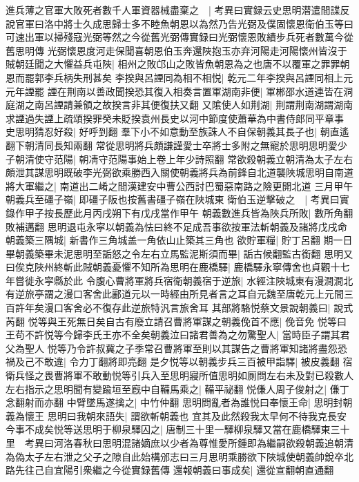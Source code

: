 進兵薄之官軍大敗死者數千人軍資器械盡棄之　|{
	考異曰實録云史思明潜遣間諜反說官軍曰洛中將士久成思歸士多不睦魚朝恩以為然乃告光弼及僕固懷恩衛伯玉等曰可速出軍以掃殘寇光弼等然之今從舊光弼傳實録曰光弼懷恩敗績步兵死者數萬今從舊思明傳}
光弼懷恩度河走保聞喜朝恩伯玉奔還陜抱玉亦弃河陽走河陽懷州皆沒于賊朝廷聞之大懼益兵屯陜|{
	相州之敗邙山之敗皆魚朝恩為之也唐不以覆軍之罪罪朝恩而罷郭李兵柄失刑甚矣}
李揆與呂諲同為相不相悦|{
	乾元二年李揆與呂諲同相上元元年諲罷}
諲在荆南以善政聞揆恐其復入相奏言置軍湖南非便|{
	軍郴邵水道連皆在洞庭湖之南呂諲請兼領之故揆言非其便復扶又翻}
又隂使人如荆湖|{
	荆謂荆南湖謂湖南}
求諲過失諲上疏頌揆罪癸未貶揆袁州長史以河中節度使蕭華為中書侍郎同平章事　史思明猜忍好殺|{
	好呼到翻}
羣下小不如意動至族誅人不自保朝義其長子也|{
	朝直遙翻下朝清同長知兩翻}
常從思明將兵頗謙謹愛士卒將士多附之無寵於思明思明愛少子朝清使守范陽|{
	朝凊守范陽事始上卷上年少詩照翻}
常欲殺朝義立朝清為太子左右頗泄其謀思明既破李光弼欲乘勝西入關使朝義將兵為前鋒自北道襲陜城思明自南道將大軍繼之|{
	南道出二崤之間漢建安中曹公西討巴蜀惡南路之險更開北道}
三月甲午朝義兵至礓子嶺|{
	即礓子阪也按舊書礓子嶺在陜城東}
衛伯玉逆擊破之　|{
	考異曰實錄作甲子按長歷此月丙戌朔下有戊戌當作甲午}
朝義數進兵皆為陜兵所敗|{
	數所角翻敗補邁翻}
思明退屯永寜以朝義為怯曰終不足成吾事欲按軍法斬朝義及諸將戊戌命朝義築三隅城|{
	新書作三角城盖一角依山止築其三角也}
欲貯軍糧|{
	貯丁呂翻}
期一日畢朝義築畢未泥思明至詬怒之令左右立馬監泥斯須而畢|{
	詬古候翻監古銜翻}
思明又曰俟克陜州終斬此賊朝義憂懼不知所為思明在鹿橋驛|{
	鹿橋驛永寧傳舍也貞觀十七年嘗徙永寜縣於此}
令腹心曹將軍將兵宿衛朝義宿于逆旅|{
	水經注陜城東有漫澗澗北有逆旅亭謂之漫口客舍此酈道元以一時經由所見者言之耳自元魏至唐乾元上元間三百許年矣漫口客舍必不復存此逆旅特汎言旅舍耳}
其部將駱悦蔡文景說朝義曰|{
	說式芮翻}
悦等與王死無日矣自古有廢立請召曹將軍謀之朝義俛首不應|{
	俛音免}
悦等曰王苟不許悦等今歸李氏王亦不全矣朝義泣曰諸君善為之勿驚聖人|{
	當時臣子謂其君父為聖人}
悦等乃令許叔冀之子季常召曹將軍至則以其謀告之曹將軍知諸將盡怨恐禍及己不敢違|{
	令力丁翻將即亮翻}
是夕悦等以朝義步兵三百被甲詣驛|{
	被皮義翻}
宿衛兵怪之畏曹將軍不敢動悦等引兵入至思明寢所值思明如厠問左右未及對已殺數人左右指示之思明聞有變踰垣至廐中自鞴馬乘之|{
	鞴平祕翻}
悦傔人周子俊射之|{
	傔丁念翻射而亦翻}
中臂墜馬遂擒之|{
	中竹仲翻}
思明問亂者為誰悦曰奉懷王命|{
	思明封朝義為懷王}
思明曰我朝來語失|{
	謂欲斬朝義也}
宜其及此然殺我太早何不待我克長安今事不成矣悦等送思明于柳泉驛囚之|{
	唐制三十里一驛柳泉驛又當在鹿橋驛東三十里　考異曰河洛春秋曰思明混諸嫡庶以少者為尊惟愛所鍾即為繼嗣欲殺朝義追朝清為偽太子左右泄之父子之隙自此始構邠志曰三月思明乘勝欲下陜城使朝義帥銳卒北路先往己自宜陽引衆繼之今從實録舊傳}
還報朝義曰事成矣|{
	還從宣翻朝直通翻}
